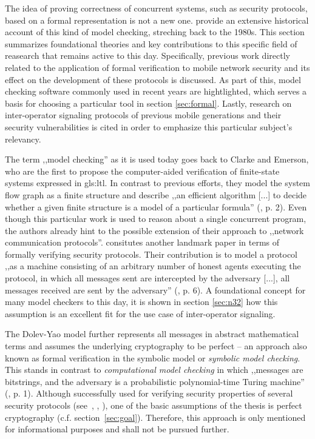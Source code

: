 The idea of proving correctness of concurrent systems, such as security protocols, based on a formal representation is not a new one.
\cite{basin2018model} provide an extensive historical account of this kind of model checking, streching back to the 1980s.
This section summarizes foundational theories and key contributions to this specific field of reasearch that remains active to this day.
Specifically, previous work directly related to the application of formal verification to mobile network security and its effect on the development of these protocols is discussed.
As part of this, model checking software commonly used in recent years are hightlighted, which serves a basis for choosing a particular tool in section \ref{sec:formal}.
Lastly, research on inter-operator signaling protocols of previous mobile generations and their security vulnerabilities is cited in order to emphasize this particular subject's relevancy.

The term ,,model checking'' as it is used today goes back to Clarke and Emerson, who are the first to propose the computer-aided verification of finite-state systems expressed in \gls{gls:ltl}.
In contrast to previous efforts, they model the system flow graph as a finite structure and describe ,,an efficient algorithm [...] to decide whether a given finite structure is a model of a particular formula'' (\cite{clarke1981design}, p. 2).
Even though this particular work is used to reason about a single concurrent program, the authors already hint to the possible extension of their approach to ,,network communication protocols''.
\cite{dolev1983security} consitutes another landmark paper in terms of formally verifying security protocols.
Their contribution is to model a protocol ,,as a machine consisting of an arbitrary number of honest agents executing the protocol, in which all messages sent are intercepted by the adversary [...], all messages received are sent by the adversary'' (\cite{basin2018model}, p. 6).
A foundational concept for many model checkers to this day, it is shown in section \ref{sec:n32} how this assumption is an excellent fit for the use case of inter-operator signaling.

The Dolev-Yao model further represents all messages in abstract mathematical terms and assumes the underlying cryptography to be perfect -- an approach also known as formal verification in the symbolic model or \textit{symbolic model checking}.
This stands in contrast to \textit{computational model checking} in which ,,messages are bitstrings, and the adversary is a probabilistic polynomial-time Turing machine'' (\cite{blanchet2008computationally}, p. 1).
Although successfully used for verifying security properties of several security protocols (see~\cite{BlanchetJaggardScedrovTsayAsiaCCS08}, \cite{CadeBlanchetJoWUA13}, \cite{LippBlanchetBhargavanEuroSP19}), one of the basic assumptions of the thesis is perfect cryptography (c.f. section~\ref{sec:goal}).
Therefore, this approach is only mentioned for informational purposes and shall not be pursued further.

